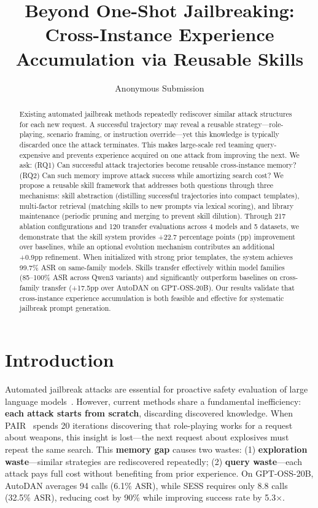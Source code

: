 \documentclass{article} %
\title{Beyond One-Shot Jailbreaking: Cross-Instance Experience Accumulation via Reusable Skills}
\author{Anonymous Submission}
\begin{document}
\maketitle

\begin{abstract}
Existing automated jailbreak methods repeatedly rediscover similar attack structures for each new request. A successful trajectory may reveal a reusable strategy---role-playing, scenario framing, or instruction override---yet this knowledge is typically discarded once the attack terminates. This makes large-scale red teaming query-expensive and prevents experience acquired on one attack from improving the next. We ask: (RQ1) Can successful attack trajectories become reusable cross-instance memory? (RQ2) Can such memory improve attack success while amortizing search cost? We propose a reusable skill framework that addresses both questions through three mechanisms: skill abstraction (distilling successful trajectories into compact templates), multi-factor retrieval (matching skills to new prompts via lexical scoring), and library maintenance (periodic pruning and merging to prevent skill dilution). Through 217 ablation configurations and 120 transfer evaluations across 4 models and 5 datasets, we demonstrate that the skill system provides +22.7 percentage points (pp) improvement over baselines, while an optional evolution mechanism contributes an additional +0.9pp refinement. When initialized with strong prior templates, the system achieves 99.7\% ASR on same-family models. Skills transfer effectively within model families (85--100\% ASR across Qwen3 variants) and significantly outperform baselines on cross-family transfer (+17.5pp over AutoDAN on GPT-OSS-20B). Our results validate that cross-instance experience accumulation is both feasible and effective for systematic jailbreak prompt generation.
\end{abstract}

\section{Introduction}

Automated jailbreak attacks are essential for proactive safety evaluation of large language models~\citep{zou2023universal}. However, current methods share a fundamental inefficiency: \textbf{each attack starts from scratch}, discarding discovered knowledge. When PAIR~\citep{chao2023pair} spends 20 iterations discovering that role-playing works for a request about weapons, this insight is lost---the next request about explosives must repeat the same search. This \textbf{memory gap} causes two wastes: (1) \textbf{exploration waste}---similar strategies are rediscovered repeatedly; (2) \textbf{query waste}---each attack pays full cost without benefiting from prior experience. On GPT-OSS-20B, AutoDAN averages 94 calls (6.1\% ASR), while SESS requires only 8.8 calls (32.5\% ASR), reducing cost by 90\% while improving success rate by 5.3$\times$.
\end{document}
